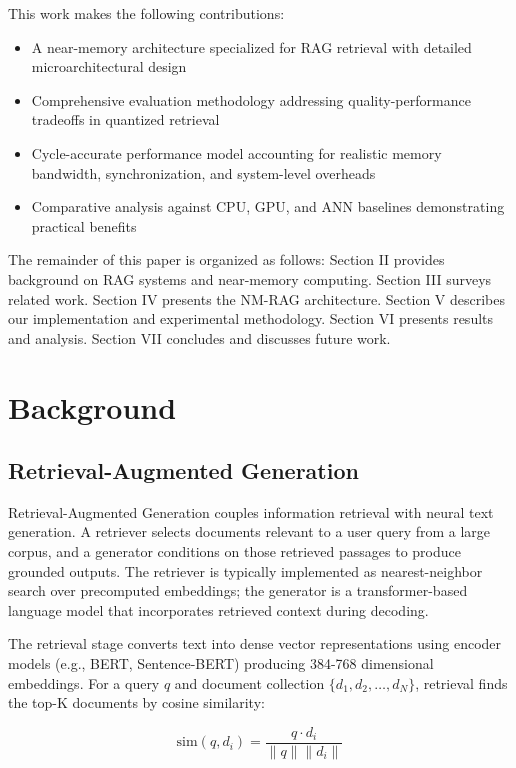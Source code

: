 \documentclass[conference]{IEEEtran}
\begin{document}
This work makes the following contributions:

\begin{itemize}
    \item A near-memory architecture specialized for RAG retrieval with detailed microarchitectural design
    \item Comprehensive evaluation methodology addressing quality-performance tradeoffs in quantized retrieval
    \item Cycle-accurate performance model accounting for realistic memory bandwidth, synchronization, and system-level overheads
    \item Comparative analysis against CPU, GPU, and ANN baselines demonstrating practical benefits
\end{itemize}

The remainder of this paper is organized as follows: Section II provides background on RAG systems and near-memory computing. Section III surveys related work. Section IV presents the NM-RAG architecture. Section V describes our implementation and experimental methodology. Section VI presents results and analysis. Section VII concludes and discusses future work.

\section{Background}

\subsection{Retrieval-Augmented Generation}

Retrieval-Augmented Generation couples information retrieval with neural text generation. A retriever selects documents relevant to a user query from a large corpus, and a generator conditions on those retrieved passages to produce grounded outputs. The retriever is typically implemented as nearest-neighbor search over precomputed embeddings; the generator is a transformer-based language model that incorporates retrieved context during decoding.

The retrieval stage converts text into dense vector representations using encoder models (e.g., BERT, Sentence-BERT) producing 384-768 dimensional embeddings. For a query $q$ and document collection $\{d_1, d_2, \ldots, d_N\}$, retrieval finds the top-K documents by cosine similarity:

\begin{equation}
\text{sim}(q, d_i) = \frac{q \cdot d_i}{\|q\| \|d_i\|}
\end{equation}
\end{document}
